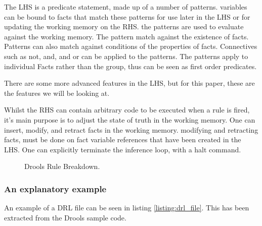 The LHS is a predicate statement, made up of a number of patterns.
variables can be bound to facts that match these patterns for use later in the LHS or for updating the working memory on the RHS.
the patterns are used to evaluate against the working memory.
The pattern match against the existence of facts.
Patterns can also match against conditions of the properties of facts.
Connectives such as not, and, and or can be applied to the patterns.
The patterns apply to individual Facts rather than the group, thus can be seen as first order predicates.

There are some more advanced features in the LHS, but for this paper, these are the features we will be looking at.

Whilst the RHS can contain arbitrary code to be executed when a rule is fired, it's main purpose is to adjust the state of truth in the working memory.
One can insert, modify, and retract facts in the working memory. 
modifying and retracting facts, must be done on fact variable references that have been created in the LHS.
One can explicitly terminate the inference loop, with a halt command.

\begin{figure}[h]
    \centering
    \caption{Drools Rule Breakdown.}
    \label{fig:Drools_Rule_Breakdown}
\end{figure}


\subsubsection{An explanatory example}
An example of a DRL file can be seen in listing \ref{listing:drl_file}.  This has been extracted from the Drools sample code. 

